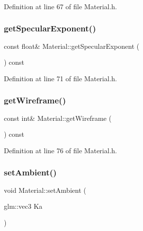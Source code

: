 Definition at line 67 of file Material.\+h.

\mbox{\label{class_material_a4087dd55f6d034d3011dafeeeed1ad2d}} 
\subsubsection{\texorpdfstring{get\+Specular\+Exponent()}{getSpecularExponent()}}
{\footnotesize\ttfamily const float\& Material\+::get\+Specular\+Exponent (\begin{DoxyParamCaption}{ }\end{DoxyParamCaption}) const\hspace{0.3cm}{\ttfamily [inline]}}



Definition at line 71 of file Material.\+h.

\mbox{\label{class_material_ad1be512566174cd3b091a6e3479a2440}} 
\subsubsection{\texorpdfstring{get\+Wireframe()}{getWireframe()}}
{\footnotesize\ttfamily const int\& Material\+::get\+Wireframe (\begin{DoxyParamCaption}{ }\end{DoxyParamCaption}) const\hspace{0.3cm}{\ttfamily [inline]}}



Definition at line 76 of file Material.\+h.

\mbox{\label{class_material_ad166d6c2ae9bc2ae460f5912ef913914}} 
\subsubsection{\texorpdfstring{set\+Ambient()}{setAmbient()}}
{\footnotesize\ttfamily void Material\+::set\+Ambient (\begin{DoxyParamCaption}\item[{glm\+::vec3}]{Ka }\end{DoxyParamCaption})\hspace{0.3cm}{\ttfamily [inline]}}



